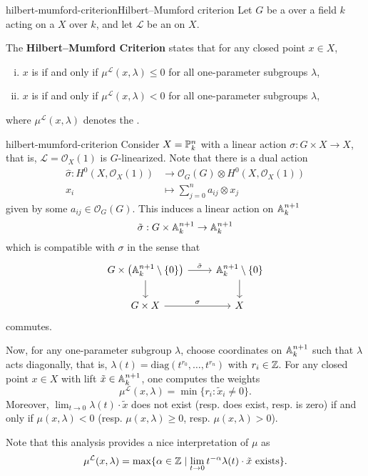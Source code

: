 \begin{topic}{hilbert-mumford-criterion}{Hilbert--Mumford criterion}
    Let $G$ be a  over a field $k$ acting on a  $X$  over $k$, and let $\mathcal{L}$ be an    on $X$.
    
    The \textbf{Hilbert--Mumford Criterion} states that for any closed point $x \in X$,
    \begin{enumerate}[(i)]
        \item $x$ is  if and only if $\mu^\mathcal{L}(x, \lambda) \le 0$ for all one-parameter subgroups $\lambda$,
        \item $x$ is  if and only if $\mu^\mathcal{L}(x, \lambda) < 0$ for all one-parameter subgroups $\lambda$,
    \end{enumerate}
    where $\mu^\mathcal{L}(x, \lambda)$ denotes the .
\end{topic}

\begin{example}{hilbert-mumford-criterion}
    Consider $X = \PP^n_k$ with a linear action $\sigma : G \times X \to X$, that is, $\mathcal{L} = \mathcal{O}_X(1)$ is $G$-linearized. Note that there is a dual action
    \[ \begin{aligned}
        \hat{\sigma} : H^0(X, \mathcal{O}_X(1)) &\to \mathcal{O}_G(G) \otimes H^0(X, \mathcal{O}_X(1)) \\
        x_i &\mapsto \sum_{j = 0}^{n} a_{ij} \otimes x_j
    \end{aligned} \]
    given by some $a_{ij} \in \mathcal{O}_G(G)$. This induces a linear action on $\AA^{n + 1}_k$
    \[ \tilde{\sigma} : G \times \AA^{n + 1}_k \to \AA^{n + 1}_k \]
    which is compatible with $\sigma$ in the sense that
    \[ \begin{tikzcd}
        G \times \left(\AA^{n + 1}_k \setminus \{ 0 \} \right) \arrow{d} \arrow{r}{\tilde{\sigma}} & \AA^{n + 1}_k \setminus \{ 0 \} \arrow{d} \\
        G \times X \arrow{r}{\sigma} & X
    \end{tikzcd} \]
    commutes.
    
    Now, for any one-parameter subgroup $\lambda$, choose coordinates on $\AA^{n + 1}_k$ such that $\lambda$ acts diagonally, that is, $\lambda(t) = \text{diag}(t^{r_0}, \ldots, t^{r_n})$ with $r_i \in \ZZ$. For any closed point $x \in X$ with lift $\tilde{x} \in \AA^{n + 1}_k$, one computes the weights
    \[ \mu^{\mathcal{L}}(x, \lambda) = \min \{ r_i : \tilde{x}_i \ne 0 \} . \]
    Moreover, $\lim_{t \to 0} \lambda(t) \cdot \tilde{x}$ does not exist (resp. does exist, resp. is zero) if and only if $\mu(x, \lambda) < 0$ (resp. $\mu(x, \lambda) \ge 0$, resp. $\mu(x, \lambda) > 0$). 
    
    Note that this analysis provides a nice interpretation of $\mu$ as
    \[ \mu^{\mathcal{L}}(x, \lambda) = \max \{ \alpha \in \ZZ \mid \lim_{t \to 0} t^{-\alpha} \lambda(t) \cdot \tilde{x} \text{ exists} \} . \]
\end{example}

